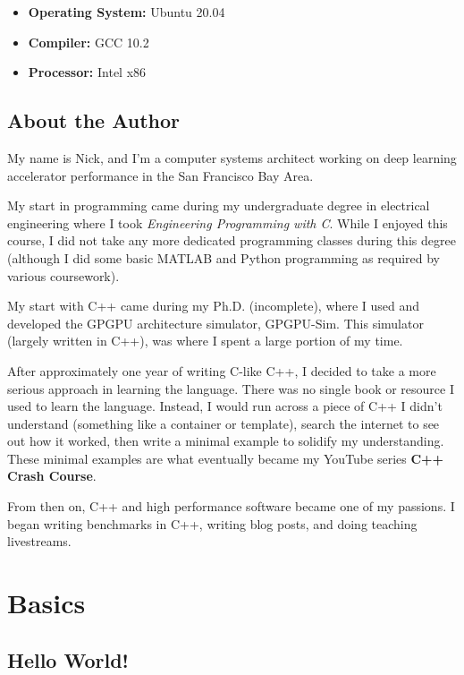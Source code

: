 \documentclass[11pt,fancy,authoryear]{elegantbook}
\begin{document}
\begin{itemize}
  \item \textbf{Operating System: } Ubuntu 20.04
  \item \textbf{Compiler: } GCC 10.2
  \item \textbf{Processor: } Intel x86
\end{itemize}

\section{About the Author}

My name is Nick, and I'm a computer systems architect working on deep learning accelerator performance in the San Francisco Bay Area.

My start in programming came during my undergraduate degree in electrical engineering where I took \textit{Engineering Programming with C}. While I enjoyed this course, I did not take any more dedicated programming classes during this degree (although I did some basic MATLAB and Python programming as required by various coursework).

My start with C++ came during my Ph.D. (incomplete), where I used and developed the GPGPU architecture simulator, GPGPU-Sim. This simulator (largely written in C++), was where I spent a large portion of my time.

After approximately one year of writing C-like C++, I decided to take a more serious approach in learning the language. There was no single book or resource I used to learn the language. Instead, I would run across a piece of C++ I didn't understand (something like a container or template), search the internet to see out how it worked, then write a minimal example to solidify my understanding. These minimal examples are what eventually became my YouTube series \textbf{C++ Crash Course}.

From then on, C++ and high performance software became one of my passions. I began writing benchmarks in C++, writing blog posts, and doing teaching livestreams.

\chapter{Basics}

\section{Hello World!}
\end{document}
